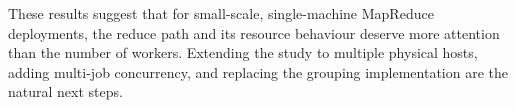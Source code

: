 \documentclass[conference]{IEEEtran}
\begin{document}
These results suggest that for small-scale, single-machine MapReduce
deployments, the reduce path and its resource behaviour deserve more
attention than the number of workers. Extending the study to multiple
physical hosts, adding multi-job concurrency, and replacing the grouping
implementation are the natural next steps.



\end{document}
